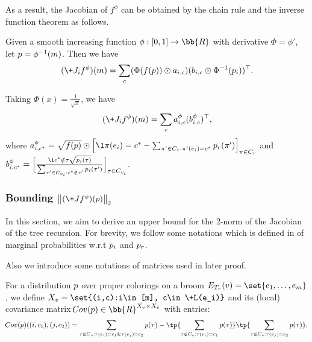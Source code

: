 As a result, the Jacobian of $f^\phi$ can be obtained by the chain rule and the inverse function theorem as follows.
\begin{proposition}\label{prop:eq_of_Ji}
Given a smooth increasing function $\phi:[0,1]\rightarrow \bb{R}$ with derivative $\Phi = \phi'$, let $\*p = \phi^{-1}(\*m)$. Then we have
\begin{align*}
    (\+J_i f^{\phi})(\*m)=\sum_c (\Phi(f(\*p))\odot \*a_{i,c})(\*b_{i,c} \odot \Phi^{-1}(\*p_i))^{\top}.
\end{align*}
\end{proposition}
Taking $\Phi(x)=\frac{1}{\sqrt{x}}$, we have
\begin{align*}
    (\+J_i f^{\phi})(\*m)=\sum_c \*a^{\phi}_{i,c} (\*b^{\phi}_{i,c})^{\top},
\end{align*}
where $\*a^{\phi}_{i,c^*}=\sqrt{f(\*p)}\odot \Big[\1{\pi(e_i)=c^*}-\sum_{\pi' \in C_{r} : \pi'(e_i)=c^*}\*p_r(\pi')\Big]_{\pi\in C_r}$ and $\*b^{\phi}_{i,c^*}=\Big[\frac{\1{c^*\notin \tau}\sqrt{\*p_i(\tau)}}{\sum_{\tau' \in C_{v_i}: c^*\notin \tau'}\*p_i(\tau')}\Big]_{\tau\in C_{v_i}}$.

\subsubsection{Bounding $\norm{(\+J f^{\phi})(\*p)}_2$}

In this section, we aim to derive an upper bound for the 2-norm of the Jacobian of the tree recursion.
For brevity, we follow some notations which is defined in  of marginal probabilities w.r.t $\*p_i$ and $\*p_r$.

Also we introduce some notations of matrices used in later proof.
\begin{definition}\label{def:covariance}
    For a distribution $\*p$ over proper colorings on a broom $E_{T_v}(v)=\set{e_1,\dots,e_m}$, we define $X_v=\set{(i,c):i\in [m], c\in \+L(e_i)}$ and its (local) covariance matrix $ \!{Cov}(\*p)\in \bb{R}^{X_v\times X_v}$ with entries:
    $$ \!{Cov}(\*p)((i,c_1),(j,c_2)) = \sum_{\tau \in C_v:\tau(e_i)=c_1 \& \tau(e_j)=c_2} \*p(\tau)-\tp{\sum_{\tau \in C_v:\tau(e_i)=c_1}\*p(\tau)}\tp{\sum_{\tau \in C_v:\tau(e_j)=c_2}\*p(\tau)}.$$
\end{definition}


